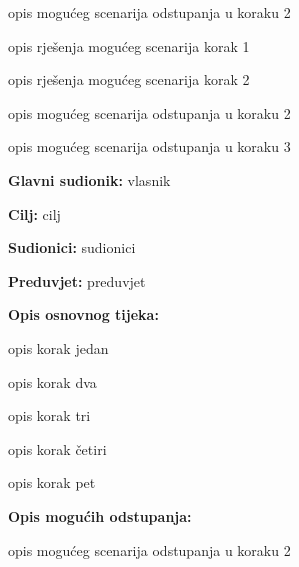 \begin{packed_enum}
\begin{packed_item}
\begin{packed_item}
							\item[2.a] opis mogućeg scenarija odstupanja u koraku 2
							\item[] \begin{packed_enum}
								
								\item opis rješenja mogućeg scenarija korak 1
								\item opis rješenja mogućeg scenarija korak 2
								
							\end{packed_enum}
							\item[2.b] opis mogućeg scenarija odstupanja u koraku 2
							\item[3.a] opis mogućeg scenarija odstupanja  u koraku 3
							
						\end{packed_item}
					\end{packed_item}
					
					\noindent {}
					\begin{packed_item}
						
						\item \textbf{Glavni sudionik: }vlasnik
						\item  \textbf{Cilj:} cilj
						\item  \textbf{Sudionici:} sudionici
						\item  \textbf{Preduvjet:} preduvjet
						\item  \textbf{Opis osnovnog tijeka:}
						
						\item[] \begin{packed_enum}
							
							\item opis korak jedan
							\item opis korak dva
							\item opis korak tri
							\item opis korak četiri
							\item opis korak pet
						\end{packed_enum}
						
						\item  \textbf{Opis mogućih odstupanja:}
						
						\item[] \begin{packed_item}
							
							\item[2.a] opis mogućeg scenarija odstupanja u koraku 2
							\item[] \begin{packed_enum}
								

\end{packed_enum}
\end{packed_item}
\end{packed_item}
\end{packed_enum}
